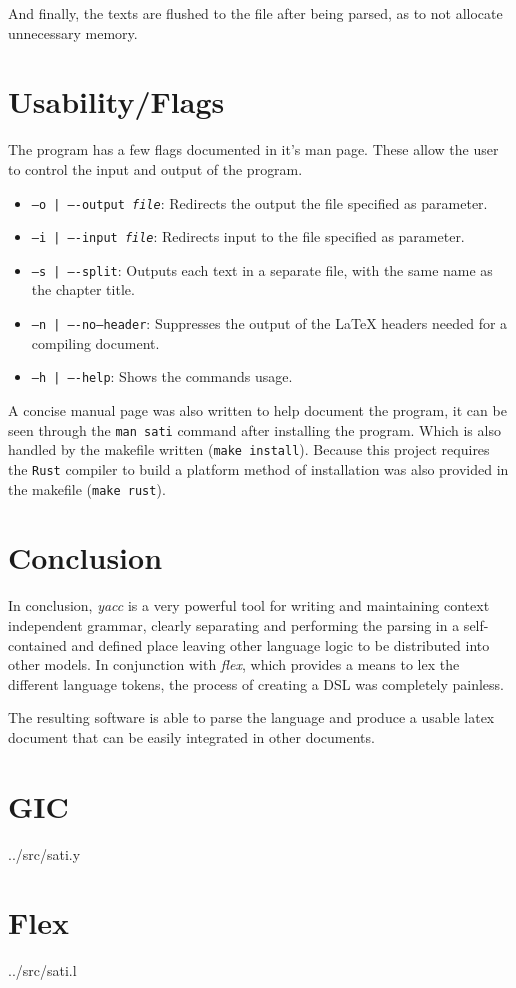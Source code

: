 \documentclass[a4paper]{report}
\begin{document}
And finally, the texts are flushed to the file after being parsed, as to not
allocate unnecessary memory.

\chapter{Usability/Flags}\label{cha:flags}

The program has a few flags documented in it's man page. These allow the user
to control the input and output of the program.

\begin{itemize}
    \item \texttt{--o | ----output \textit{file}}: Redirects the output the file
        specified as parameter.
    \item \texttt{--i | ----input \textit{file}}: Redirects input to the file
        specified as parameter.
    \item \texttt{--s | ----split}: Outputs each text in a separate file, with
        the same name as the chapter title.
    \item \texttt{--n | ----no--header}: Suppresses the output of the \LaTeX{}
        headers needed for a compiling document.
    \item \texttt{--h | ----help}: Shows the commands usage.
\end{itemize}

A concise manual page was also written to help document the program, it can be seen
through the \texttt{man sati} command after installing the program. Which is
also handled by the makefile written (\texttt{make install}). Because this
project requires the \texttt{Rust} compiler to build a platform method of
installation was also provided in the makefile (\texttt{make rust}).

\chapter{Conclusion}

In conclusion, \textit{yacc} is a very powerful tool for writing and
maintaining context independent grammar, clearly separating and performing the
parsing in a self-contained and defined place leaving other language logic to be
distributed into other models. In conjunction with \textit{flex}, which
provides a means to lex the different language tokens, the process of creating
a DSL was completely painless.

The resulting software is able to parse the language and produce a usable latex
document that can be easily integrated in other documents.

\appendix

\chapter{GIC}


{../src/sati.y}

\chapter{Flex}


{../src/sati.l}
\end{document}
